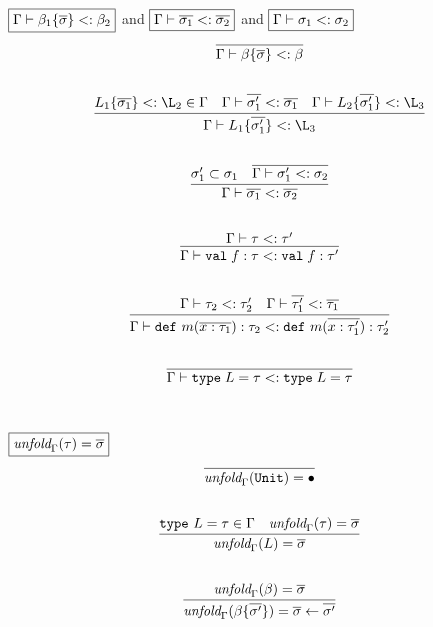 \documentclass{article}
\newcommand{\keywadj}[1]{\mathtt{#1}}
\newcommand{\keyw}[1]{\keywadj{#1}~}
\begin{document}
$\fbox{$\Gamma \vdash \beta_1\{\overline{\sigma}\} <: \beta_2$}$ and $\fbox{$\Gamma \vdash \overline{\sigma_1} <: \overline{\sigma_2}$}$  and $\fbox{$\Gamma \vdash \sigma_1 <: \sigma_2$}$
\[
\begin{array}{c}

\infer
  {\Gamma \vdash \beta\{\overline{\sigma}\} <: \beta}
  {}\\[5ex]

\infer
  {\Gamma \vdash L_1\{\overline{\sigma_1'}\} <: \L_3}
  {L_1\{\overline{\sigma_1}\} <: \L_2 \in \Gamma & \Gamma \vdash \overline{\sigma_1'} <: \overline{\sigma_1} & \Gamma \vdash L_2\{\overline{\sigma_1'}\} <: \L_3}\\[5ex]

\infer
  {\Gamma \vdash \overline{\sigma_1} <: \overline{\sigma_2}}
  {\sigma_1' \subset \sigma_1 & \overline{\Gamma \vdash \sigma_1' <: \sigma_2}}\\[5ex]
  
\infer
  {\Gamma \vdash \texttt{val} \; f:\tau <: \texttt{val} \; f:\tau'}
  {\Gamma \vdash \tau <: \tau'}\\[5ex]

\infer
  {\Gamma \vdash \keyw{def} m(\overline{x:\tau_1}) : \tau_2 <: \keyw{def} m(\overline{x:\tau_1'}) : \tau_2'}
  {\Gamma \vdash \tau_2 <: \tau_2' & \Gamma \vdash \overline{\tau_1'} <: \overline{\tau_1}}\\[5ex]

\infer
  {\Gamma \vdash \texttt{type} \; L = \tau <: \texttt{type} \; L = \tau}
  {}\\[5ex]

\end{array}
\]

$\fbox{$\textit{unfold}_\Gamma(\tau) = \overline{\sigma}$}$
\[
\begin{array}{c}

\infer
  {\textit{unfold}_\Gamma(\keywadj{Unit}) = \bullet}
  {}\\[5ex]
  
\infer
  {\textit{unfold}_\Gamma(L) = \overline{\sigma}}
  {\keyw{type} L = \tau \in \Gamma & \textit{unfold}_\Gamma(\tau) = \overline{\sigma}}\\[5ex]
  
\infer
  {\textit{unfold}_\Gamma(\beta \{\overline{\sigma'}\}) = \overline{\sigma} \leftarrow \overline{\sigma'}}
  {\textit{unfold}_\Gamma(\beta) = \overline{\sigma}}\\[5ex]
  
\end{array}
\]
\end{document}
